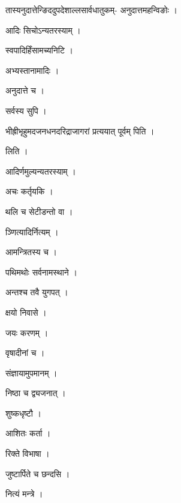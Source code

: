 \documentclass[10pt, openany, oneside]{book}
\begin{document}
\noindent तास्यनुदात्तेन्ङिददुपदेशाल्लसार्वधातुकम्- अनुदात्तमहन्विङोः ।

\noindent आदिः सिचोऽन्यतरस्याम् ।

\noindent स्वपादिर्हिंसामच्यनिटि ।

\noindent अभ्यस्तानामादिः ।

\noindent अनुदात्ते च ।

\noindent सर्वस्य सुपि ।

\noindent भीह्रीभृहुमदजनधनदरिद्राजागरां प्रत्ययात् पूर्वम् पिति ।

\noindent लिति ।

\noindent आदिर्णमुल्यन्यतरस्याम् ।

\noindent अचः कर्तृयकि ।

\noindent थलि च सेटीडन्तो वा ।

\noindent ञ्णित्यादिर्नित्यम् ।

\noindent आमन्त्रितस्य च ।

\noindent पथिमथोः सर्वनामस्थाने ।

\noindent अन्तश्च तवै युगपत् ।

\noindent क्षयो निवासे ।

\noindent जयः करणम् ।

\noindent वृषादीनां च ।

\noindent संज्ञायामुपमानम् ।

\noindent निष्ठा च द्व्यजनात् ।

\noindent शुष्कधृष्टौ ।

\noindent आशितः कर्ता ।

\noindent रिक्ते विभाषा ।

\noindent जुष्टार्पिते च छन्दसि ।

\noindent नित्यं मन्त्रे ।
\end{document}
